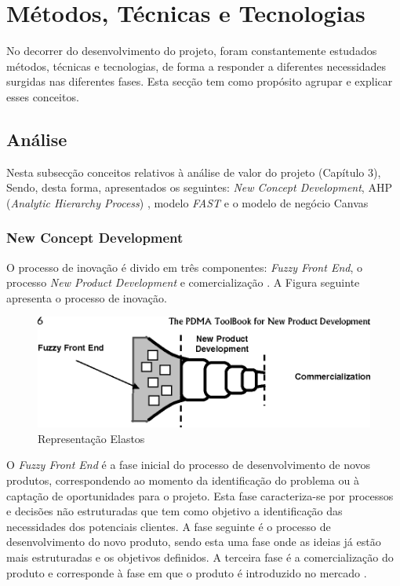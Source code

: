 \section{Métodos, Técnicas e Tecnologias}
No decorrer do desenvolvimento do projeto, foram constantemente estudados métodos, técnicas e tecnologias, de forma a responder a diferentes necessidades surgidas nas diferentes fases. Esta secção tem como propósito agrupar e explicar esses conceitos.

\subsection{Análise}
Nesta subsecção conceitos relativos à análise de valor do projeto (Capítulo 3), Sendo, desta forma, apresentados os seguintes: \emph{New Concept Development}, AHP (\emph{Analytic Hierarchy  Process}) \label{sym:AHP}, modelo \emph{FAST} e o modelo de negócio Canvas

\subsubsection{New Concept Development}
O processo de inovação é divido em três componentes: \emph{Fuzzy
Front End}, o processo \emph{New Product Development} e comercialização \cite{fuzzy_frontend}. A Figura seguinte
apresenta o processo de inovação.

\begin{figure}[H]
    \begin{center}
    \includegraphics[width=1\textwidth]{figures/new_product_development.png}
    \caption{Representação Elastos}
    \end{center}
\end{figure}

O \emph{Fuzzy Front End} é a fase inicial do processo de desenvolvimento de novos produtos, correspondendo ao momento da identificação do problema ou à captação de oportunidades para o
projeto. Esta fase caracteriza-se por processos e decisões não estruturadas que tem como objetivo a identificação das necessidades dos potenciais clientes. A fase seguinte é o processo de  desenvolvimento do novo produto, sendo esta uma fase onde as ideias já estão mais estruturadas e os objetivos definidos. A terceira fase é a comercialização
do produto e corresponde à fase em que o produto é introduzido no mercado \cite{fuzzy_frontend}.

